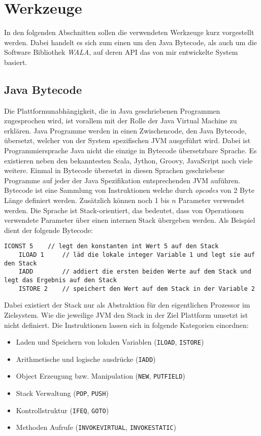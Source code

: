 \chapter{Werkzeuge}

In den folgenden Abschnitten sollen die verwendeten Werkzeuge kurz vorgestellt werden. Dabei handelt es 
sich zum einen um den Java Bytecode, als auch um die Software Bibliothek \textit{WALA}, auf deren API das 
von mir entwickelte System basiert. 

\section{Java Bytecode}

Die Plattformunabhängigkeit, die in Java geschriebenen Programmen zugesprochen wird, ist vorallem mit der 
Rolle der Java  Virtual Machine zu erklären. Java Programme werden in einen Zwischencode, den Java Bytecode, 
übersetzt, welcher von der System spezifischen JVM ausgeführt wird. Dabei ist Programmiersprache Java nicht 
die einzige in Bytecode übersetzbare Sprache. Es existieren neben den bekanntesten Scala, Jython, Groovy,
JavaScript noch viele weitere. Einmal in Bytecode übersetzt in diesen Sprachen geschriebene Programme auf 
jeder der Java Spezifikation entsprechenden JVM auführen. 
\\
Bytecode ist eine Sammlung von Instruktionen welche durch \textit{opcodes} von 2 Byte Länge definiert 
werden. Zusätzlich können noch 1 bis $n$ Parameter verwendet werden. Die Sprache ist Stack-orientiert, das 
bedeutet, dass von Operationen verwendete Parameter über einen internen Stack übergeben werden. Als Beispiel 
dient der folgende Bytecode:

\begin{lstlisting}[language=Bytecode]
	ICONST 5 	// legt den konstanten int Wert 5 auf den Stack 
	ILOAD 1		// läd die lokale integer Variable 1 und legt sie auf den Stack
	IADD 		// addiert die ersten beiden Werte auf dem Stack und legt das Ergebnis auf den Stack
	ISTORE 2	// speichert den Wert auf dem Stack in der Variable 2
\end{lstlisting} 

Dabei existiert der Stack nur als Abstraktion für den eigentlichen Prozessor im Zielsystem. Wie die 
jeweilige JVM den Stack in der Ziel Plattform umsetzt ist nicht definiert. Die Instruktionen lassen sich in 
folgende Kategorien einordnen:

\begin{itemize}
	\item Laden und Speichern von lokalen Variablen (\texttt{ILOAD}, \texttt{ISTORE})
	\item Arithmetische und logische ausdrücke (\texttt{IADD})
	\item Object Erzeugung bzw. Manipulation (\texttt{NEW}, \texttt{PUTFIELD})
	\item Stack Verwaltung (\texttt{POP}, \texttt{PUSH}) 
	\item Kontrollstruktur (\texttt{IFEQ}, \texttt{GOTO})
	\item Methoden Aufrufe (\texttt{INVOKEVIRTUAL}, \texttt{INVOKESTATIC})
\end{itemize}  


